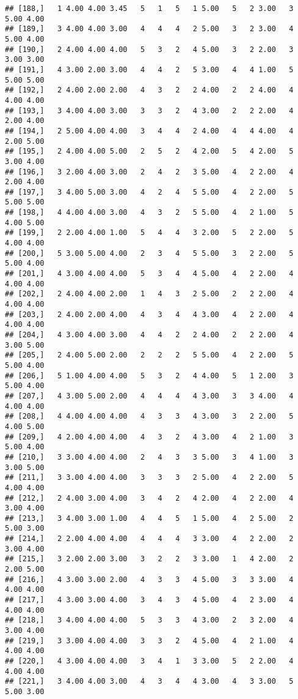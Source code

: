 \documentclass[]{article}
\begin{document}
\begin{verbatim}
## [188,]   1 4.00 4.00 3.45   5   1   5   1 5.00   5   2 3.00   3 5.00 4.00
## [189,]   3 4.00 4.00 3.00   4   4   4   2 5.00   3   2 3.00   4 5.00 4.00
## [190,]   2 4.00 4.00 4.00   5   3   2   4 5.00   3   2 2.00   3 3.00 3.00
## [191,]   4 3.00 2.00 3.00   4   4   2   5 3.00   4   4 1.00   5 5.00 5.00
## [192,]   2 4.00 2.00 2.00   4   3   2   2 4.00   2   2 4.00   4 4.00 4.00
## [193,]   3 4.00 4.00 3.00   3   3   2   4 3.00   2   2 2.00   4 2.00 4.00
## [194,]   2 5.00 4.00 4.00   3   4   4   2 4.00   4   4 4.00   4 2.00 5.00
## [195,]   2 4.00 4.00 5.00   2   5   2   4 2.00   5   4 2.00   5 3.00 4.00
## [196,]   3 2.00 4.00 3.00   2   4   2   3 5.00   4   2 2.00   4 2.00 4.00
## [197,]   3 4.00 5.00 3.00   4   2   4   5 5.00   4   2 2.00   5 5.00 5.00
## [198,]   4 4.00 4.00 3.00   4   3   2   5 5.00   4   2 1.00   5 4.00 5.00
## [199,]   2 2.00 4.00 1.00   5   4   4   3 2.00   5   2 2.00   5 4.00 4.00
## [200,]   5 3.00 5.00 4.00   2   3   4   5 5.00   3   2 2.00   5 5.00 4.00
## [201,]   4 3.00 4.00 4.00   5   3   4   4 5.00   4   2 2.00   4 4.00 4.00
## [202,]   2 4.00 4.00 2.00   1   4   3   2 5.00   2   2 2.00   4 4.00 4.00
## [203,]   2 4.00 2.00 4.00   4   3   4   4 3.00   4   2 2.00   4 4.00 4.00
## [204,]   4 3.00 4.00 3.00   4   4   2   2 4.00   2   2 2.00   4 3.00 5.00
## [205,]   2 4.00 5.00 2.00   2   2   2   5 5.00   4   2 2.00   5 5.00 4.00
## [206,]   5 1.00 4.00 4.00   5   3   2   4 4.00   5   1 2.00   3 5.00 4.00
## [207,]   4 3.00 5.00 2.00   4   4   4   4 3.00   3   3 4.00   4 4.00 4.00
## [208,]   4 4.00 4.00 4.00   4   3   3   4 3.00   3   2 2.00   5 4.00 5.00
## [209,]   4 2.00 4.00 4.00   4   3   2   4 3.00   4   2 1.00   3 5.00 4.00
## [210,]   3 3.00 4.00 4.00   2   4   3   3 5.00   3   4 1.00   3 3.00 5.00
## [211,]   3 3.00 4.00 4.00   3   3   3   2 5.00   4   2 2.00   5 4.00 4.00
## [212,]   2 4.00 3.00 4.00   3   4   2   4 2.00   4   2 2.00   4 3.00 4.00
## [213,]   3 4.00 3.00 1.00   4   4   5   1 5.00   4   2 5.00   2 5.00 3.00
## [214,]   2 2.00 4.00 4.00   4   4   4   3 3.00   4   2 2.00   2 3.00 4.00
## [215,]   3 2.00 2.00 3.00   3   2   2   3 3.00   1   4 2.00   2 2.00 5.00
## [216,]   4 3.00 3.00 2.00   4   3   3   4 5.00   3   3 3.00   4 4.00 4.00
## [217,]   4 3.00 3.00 4.00   3   4   3   4 5.00   4   2 3.00   4 4.00 4.00
## [218,]   3 4.00 4.00 4.00   5   3   3   4 3.00   2   3 2.00   4 3.00 4.00
## [219,]   3 3.00 4.00 4.00   3   3   2   4 5.00   4   2 1.00   4 4.00 4.00
## [220,]   4 3.00 4.00 4.00   3   4   1   3 3.00   5   2 2.00   4 4.00 4.00
## [221,]   3 4.00 4.00 3.00   4   3   4   4 3.00   4   3 3.00   5 5.00 3.00

\end{verbatim}
\end{document}
